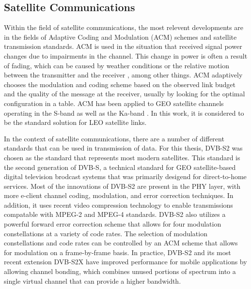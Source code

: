 \subsection{Satellite Communications}
\par Within the field of satellite communications, the most relevent developments are in the fields of Adaptive Coding and Modulation (ACM) schemes and satellite transmission standards.  ACM is used in the situation that received signal power changes due to impairments in the channel. This change in power is often a result of fading, which can be caused by weather conditions or the relative motion between the transmitter and the receiver \cite{paulo17}, among other things. ACM adaptively chooses the modulation and coding scheme based on the observed link budget and the quality of the message at the receiver, usually by looking for the optimal configuration in a table. ACM has been applied to GEO satellite channels operating in the S-band \cite{paulo18} as well as the Ka-band \cite{paulo19}. In this work, it is considered to be the standard solution for LEO satellite links.  
\par In the context of satellite communications, there are a number of different standards that can be used in transmission of data. For this thesis, DVB-S2 \cite{paulo21} was chosen as the standard that represents most modern satellites. This standard is the second generation of DVB-S, a technical standard for GEO satellite-based digital television brodcast systems that was primarily desigend for direct-to-home services. Most of the innovations of DVB-S2 are present in the PHY layer, with more e-client channel coding, modulation, and error correction techniques. In addition, it uses recent video compression technology to enable transmissions compatable with MPEG-2 and MPEG-4 standards. DVB-S2 also utilizes a powerful forward error correction scheme that allows for four modulation constellations at a variety of code rates. The selection of modulation constellations and code rates can be controlled by an ACM scheme that allows for modulation on a frame-by-frame basis. In practice, DVB-S2 and its most recent extension DVB-S2X \cite{paulo22} have improved performance for mobile applications by allowing channel bonding, which combines unused portions of spectrum into a single virtual channel that can provide a higher bandwidth.
